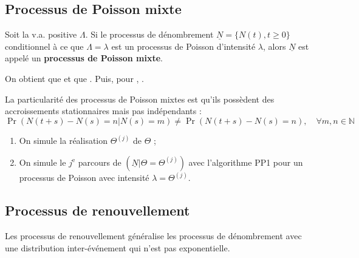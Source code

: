 \documentclass[10pt, french]{article}
\begin{document}
\begin{multicols*}{2}
\columnbreak
\subsection{Processus de Poisson mixte}
\begin{definitionNOHFILL}
Soit la v.a. positive $\Lambda$. Si le processus de dénombrement $\underline{N}	=	\{N(t), t \geq 0\}$ conditionnel à ce que $\Lambda = \lambda$ est un processus de Poisson d'intensité $\lambda$, alors $\underline{N}$ est appelé un \textbf{processus de Poisson mixte}.

\bigskip

On obtient que  et que . Puis, pour , .

\bigskip

La particularité des processus de Poisson mixtes est qu'ils possèdent des accroissements stationnaires mais pas indépendants : $\Pr\left(N(t + s) - N(s) = n | N(s) = m\right) \neq \Pr\left(N(t + s)	-	N(s)	=	n\right), \quad \forall m, n \in \mathbb{N}$
\end{definitionNOHFILL}



\begin{algo2}
\begin{enumerate}
	\item	On simule la réalisation $\Theta^{(j)}$ de $\Theta$ ;
	\item	On simule le $j^{\text{e}}$ parcours de $(\underline{N} | \Theta = \Theta^{(j)})$ avec l'algorithme PP1 pour un processus de Poisson avec intensité $\lambda = \Theta^{(j)}$.
\end{enumerate}
\end{algo2}



\columnbreak
\subsection{Processus de renouvellement}
\begin{rappel_enhanced}[Contexte]
Les processus de renouvellement généralise les processus de dénombrement avec une distribution inter-événement qui n'est pas exponentielle.
\end{rappel_enhanced}



\end{multicols*}
\end{document}
